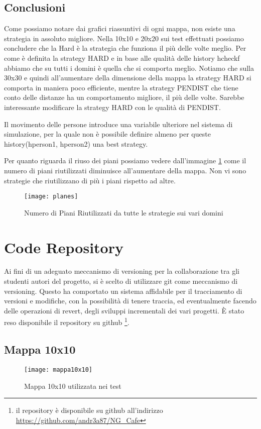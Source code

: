\newpage
\section{Conclusioni}
Come possiamo notare dai grafici riassuntivi di ogni mappa, non esiste una strategia in assoluto migliore. Nella 10x10 e 20x20 sui test effettuati possiamo concludere che la Hard è la strategia che funziona il più delle volte meglio. Per come è definita la strategy HARD e in base alle qualità delle history hcheckf abbiamo che su tutti i domini è quella che si comporta meglio.
Notiamo che sulla 30x30 e quindi all'aumentare della dimensione della mappa la strategy HARD si comporta in maniera poco efficiente, mentre la strategy PENDIST che tiene conto delle distanze ha un comportamento migliore, il più delle volte. Sarebbe interessante modificare la strategy HARD con le qualità di PENDIST.

Il movimento delle persone introduce una variabile ulteriore nel sistema di simulazione, per la quale non è possibile definire almeno per queste history(hperson1, hperson2) una best strategy.

Per quanto riguarda il riuso dei piani possiamo vedere dall'immagine \ref{fig:figure13} come il numero di piani riutilizzati diminuisce all'aumentare della mappa. Non vi sono strategie che riutilizzano di più i piani rispetto ad altre.
\begin{figure}[h!tp]
  \texttt{[image: planes]}
  \caption{Numero di Piani Riutilizzati da tutte le strategie sui vari domini}
  \label{fig:figure13}
\end{figure}


\appendix
\chapter{Code Repository}

Ai fini di un adeguato meccanismo di versioning per la collaborazione tra gli studenti autori del progetto, si è scelto di utilizzare git come meccanismo di versioning.
Questo ha comportato un sistema affidabile per il tracciamento di versioni e modifiche, con la possibilità di tenere traccia, ed eventualmente facendo delle operazioni di revert, degli sviluppi incrementali dei vari progetti.
È stato reso disponibile il repository su github \footnote{il repository è disponibile su github all'indirizzo \url{https://github.com/andr3a87/NG_Cafe} }.
\newpage
\section{Mappa 10x10}
\begin{figure}[htp]
  \texttt{[image: mappa10x10]}
  \caption{Mappa 10x10 utilizzata nei test}
  \label{fig:figure14}
\end{figure}
\newpage
